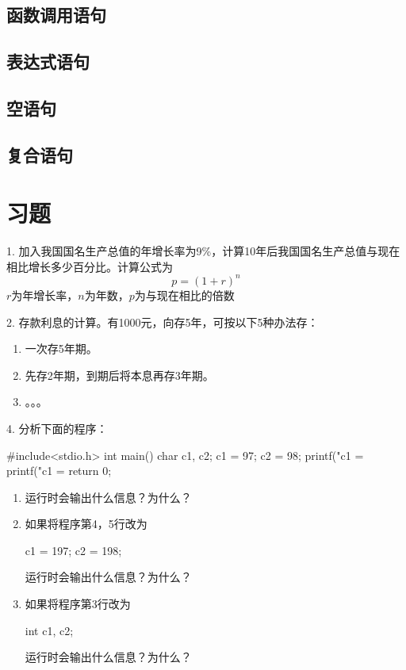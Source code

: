 \begin{lslisting}
\begin{enumerate}
\subsection{函数调用语句}
\subsection{表达式语句}
\subsection{空语句}
\subsection{复合语句}

\section{习题}

1. 加入我国国名生产总值的年增长率为9\%，计算10年后我国国名生产总值与现在相比增长多少百分比。计算公式为
\begin{equation}
p = (1 + r) ^ n
\end{equation}
$r$为年增长率，$n$为年数，$p$为与现在相比的倍数

2. 存款利息的计算。有1000元，向存5年，可按以下5种办法存：
\begin{enumerate}
	\item 一次存5年期。
	\item 先存2年期，到期后将本息再存3年期。
	\item 。。。
\end{enumerate}

4. 分析下面的程序：
\begin{lslisting}
#include<stdio.h>
int main()
{ char c1, c2;
  c1 = 97;
  c2 = 98;
  printf("c1 = %
  printf("c1 = %
  return 0;
}
\end{lslisting}
\begin{enumerate}
	\item 运行时会输出什么信息？为什么？
	\item 如果将程序第4，5行改为
		\begin{lslisting}
		c1 = 197;
		c2 = 198;
		\end{lslisting}
运行时会输出什么信息？为什么？
	\item 如果将程序第3行改为
	\begin{lslisting}
	int c1, c2;
	\end{lslisting}
运行时会输出什么信息？为什么？
\end{enumerate}


\end{enumerate}
\end{lslisting}
